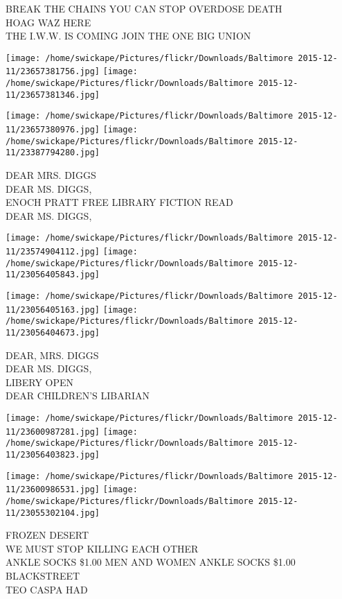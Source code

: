 \documentclass[10pt,letterpaper]{article}
\begin{document}
BREAK THE CHAINS YOU CAN STOP OVERDOSE DEATH\\
HOAG WAZ HERE\\
THE I.W.W. IS COMING JOIN THE ONE BIG UNION
\pagebreak

\texttt{[image: /home/swickape/Pictures/flickr/Downloads/Baltimore 2015-12-11/23657381756.jpg]}
\texttt{[image: /home/swickape/Pictures/flickr/Downloads/Baltimore 2015-12-11/23657381346.jpg]}

\texttt{[image: /home/swickape/Pictures/flickr/Downloads/Baltimore 2015-12-11/23657380976.jpg]}
\texttt{[image: /home/swickape/Pictures/flickr/Downloads/Baltimore 2015-12-11/23387794280.jpg]}

DEAR MRS. DIGGS\\
DEAR MS. DIGGS,\\
ENOCH PRATT FREE LIBRARY FICTION READ\\
DEAR MS. DIGGS,
\pagebreak

\texttt{[image: /home/swickape/Pictures/flickr/Downloads/Baltimore 2015-12-11/23574904112.jpg]}
\texttt{[image: /home/swickape/Pictures/flickr/Downloads/Baltimore 2015-12-11/23056405843.jpg]}

\texttt{[image: /home/swickape/Pictures/flickr/Downloads/Baltimore 2015-12-11/23056405163.jpg]}
\texttt{[image: /home/swickape/Pictures/flickr/Downloads/Baltimore 2015-12-11/23056404673.jpg]}

DEAR, MRS. DIGGS\\
DEAR MS. DIGGS,\\
LIBERY OPEN\\
DEAR CHILDREN'S LIBARIAN
\pagebreak

\texttt{[image: /home/swickape/Pictures/flickr/Downloads/Baltimore 2015-12-11/23600987281.jpg]}
\texttt{[image: /home/swickape/Pictures/flickr/Downloads/Baltimore 2015-12-11/23056403823.jpg]}

\texttt{[image: /home/swickape/Pictures/flickr/Downloads/Baltimore 2015-12-11/23600986531.jpg]}
\texttt{[image: /home/swickape/Pictures/flickr/Downloads/Baltimore 2015-12-11/23055302104.jpg]}

FROZEN DESERT\\
WE MUST STOP KILLING EACH OTHER\\
ANKLE SOCKS \$1.00 MEN AND WOMEN ANKLE SOCKS \$1.00 BLACKSTREET\\
TEO CASPA HAD
\pagebreak
\end{document}
